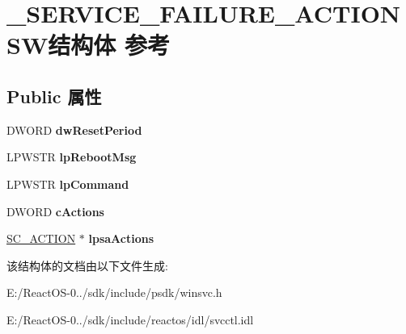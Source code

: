 \hypertarget{struct___s_e_r_v_i_c_e___f_a_i_l_u_r_e___a_c_t_i_o_n_s_w}{}\section{\+\_\+\+S\+E\+R\+V\+I\+C\+E\+\_\+\+F\+A\+I\+L\+U\+R\+E\+\_\+\+A\+C\+T\+I\+O\+N\+S\+W结构体 参考}
\label{struct___s_e_r_v_i_c_e___f_a_i_l_u_r_e___a_c_t_i_o_n_s_w}
\subsection*{Public 属性}
\begin{DoxyCompactItemize}
\item 
\mbox{\label{struct___s_e_r_v_i_c_e___f_a_i_l_u_r_e___a_c_t_i_o_n_s_w_ac21b190b4bac7a7e325c891aa05a9805}} 
D\+W\+O\+RD {\bfseries dw\+Reset\+Period}
\item 
\mbox{\label{struct___s_e_r_v_i_c_e___f_a_i_l_u_r_e___a_c_t_i_o_n_s_w_ac3787e6a4f38c7630448944cdfc5d5af}} 
L\+P\+W\+S\+TR {\bfseries lp\+Reboot\+Msg}
\item 
\mbox{\label{struct___s_e_r_v_i_c_e___f_a_i_l_u_r_e___a_c_t_i_o_n_s_w_a8717a314b3fa0124c520b128192d783e}} 
L\+P\+W\+S\+TR {\bfseries lp\+Command}
\item 
\mbox{\label{struct___s_e_r_v_i_c_e___f_a_i_l_u_r_e___a_c_t_i_o_n_s_w_a45ae83473868ffcebb19cc21a085505a}} 
D\+W\+O\+RD {\bfseries c\+Actions}
\item 
\mbox{\label{struct___s_e_r_v_i_c_e___f_a_i_l_u_r_e___a_c_t_i_o_n_s_w_ab4dc68be51b60f9cb0fce0e6b7e8a190}} 
\hyperlink{struct___s_c___a_c_t_i_o_n}{S\+C\+\_\+\+A\+C\+T\+I\+ON} $\ast$ {\bfseries lpsa\+Actions}
\end{DoxyCompactItemize}


该结构体的文档由以下文件生成\+:\begin{DoxyCompactItemize}
\item 
E\+:/\+React\+O\+S-\/0../sdk/include/psdk/winsvc.\+h\item 
E\+:/\+React\+O\+S-\/0../sdk/include/reactos/idl/svcctl.\+idl\end{DoxyCompactItemize}
